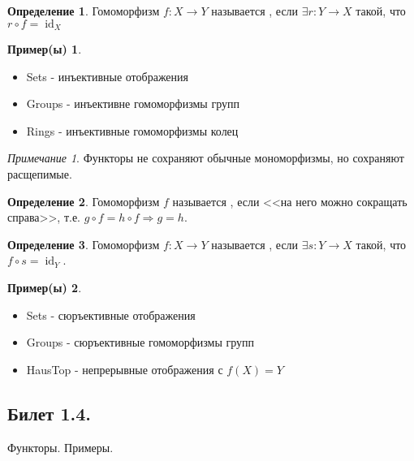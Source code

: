 \documentclass[a4paper]{article}
\theoremstyle{indented}
\theoremstyle{definition}
\newtheorem{defn}{Определение}
\newtheorem{exl}{Пример(ы)}
\theoremstyle{remark}
\newtheorem{remark}{Примечание}
\DeclareMathOperator{\ra}{\rightarrow}
\DeclareMathOperator{\Ra}{\Rightarrow}
\DeclareMathOperator{\id}{id}
\begin{document}
\begin{defn}
    Гомоморфизм $f: X \ra Y$ называется , если $\exists r: Y \ra X$ такой, что $r \circ f =\id_X$
\end{defn}

\begin{exl} \
    \begin{itemize}
        \item Sets - инъективные отображения
        \item Groups - инъективне гомоморфизмы групп
        \item Rings - инъективные гомоморфизмы колец
    \end{itemize}
\end{exl}

\begin{remark}
    Функторы не сохраняют обычные мономорфизмы, но сохраняют расщепимые.
\end{remark}

\begin{defn}
    Гомоморфизм $f$ называется , если <<на него можно сокращать справа>>, т.е. $g \circ f = h \circ f \Ra g = h$. 
\end{defn}

\begin{defn}
    Гомоморфизм $f: X \ra Y$ называется , если $\exists s : Y \ra X$ такой, что $f \circ s =\id_Y$.
\end{defn}

\begin{exl} \
    \begin{itemize}
        \item Sets - сюръективные отображения
        \item Groups - сюръективные гомоморфизмы групп
        \item HausTop - непрерывные отображения с $f(X) = Y$
    \end{itemize}
\end{exl}



\newpage

\subsection{Билет 1.4.}

Функторы. Примеры. 

\hrulefill
\end{document}
